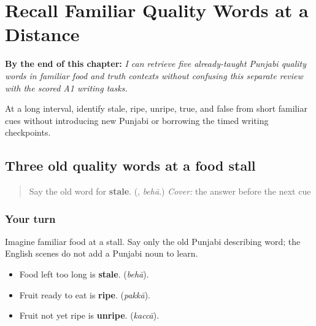 
\chapter{Recall Familiar Quality Words at a Distance}
\label{ch:pa-quality-words-at-a-distance}

\begin{chapteropening}
\textbf{By the end of this chapter:} \emph{I can retrieve five already-taught Punjabi quality words in familiar food and truth contexts without confusing this separate review with the scored A1 writing tasks.}

At a long interval, identify stale, ripe, unripe, true, and false from short familiar cues without introducing new Punjabi or borrowing the timed writing checkpoints.
\end{chapteropening}

\section[\texorpdfstring{\pa{ਬੇਹਾ} · \pa{ਪੱਕਾ} · \pa{ਕੱਚਾ} (behā · pakkā · kaccā)}{ਬੇਹਾ · ਪੱਕਾ · ਕੱਚਾ (behā · pakkā · kaccā)}]{Three old quality words at a food stall}

\label{lesson:PA-R158-food-quality-recall}



\begin{quote}
Say the old word for \textbf{stale}. (\textbf{}, \emph{behā}.) \emph{Cover:} the answer before the next cue
\end{quote}

\subsection*{Your turn}
Imagine familiar food at a stall. Say only the old Punjabi describing word; the English scenes do not add a Punjabi noun to learn.

\begin{itemize}
\raggedright
  \item Food left too long is \textbf{stale}. \textbf{} (\emph{behā}).
  \item Fruit ready to eat is \textbf{ripe}. \textbf{} (\emph{pakkā}).
  \item Fruit not yet ripe is \textbf{unripe}. \textbf{} (\emph{kaccā}).
\end{itemize}

